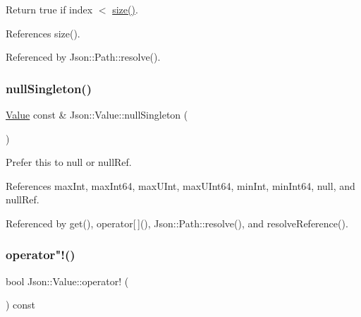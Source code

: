 Return true if index $<$ \hyperlink{classJson_1_1Value_a0ec2808e1d7efa4e9fad938d6667be44_a0ec2808e1d7efa4e9fad938d6667be44}{size()}. 



References size().



Referenced by Json\+::\+Path\+::resolve().

\mbox{\label{classJson_1_1Value_af2f124567acc35d021a424e53ebdfcab_af2f124567acc35d021a424e53ebdfcab}} 
\subsubsection{\texorpdfstring{null\+Singleton()}{nullSingleton()}}
{\footnotesize\ttfamily \hyperlink{classJson_1_1Value}{Value} const  \& Json\+::\+Value\+::null\+Singleton (\begin{DoxyParamCaption}{ }\end{DoxyParamCaption})\hspace{0.3cm}{\ttfamily [static]}}



Prefer this to null or null\+Ref. 



References max\+Int, max\+Int64, max\+U\+Int, max\+U\+Int64, min\+Int, min\+Int64, null, and null\+Ref.



Referenced by get(), operator\mbox{[}$\,$\mbox{]}(), Json\+::\+Path\+::resolve(), and resolve\+Reference().

\mbox{\label{classJson_1_1Value_a731b89fb4764c39ce2328e1707c822b9_a731b89fb4764c39ce2328e1707c822b9}} 
\subsubsection{\texorpdfstring{operator"!()}{operator!()}}
{\footnotesize\ttfamily bool Json\+::\+Value\+::operator! (\begin{DoxyParamCaption}{ }\end{DoxyParamCaption}) const}



